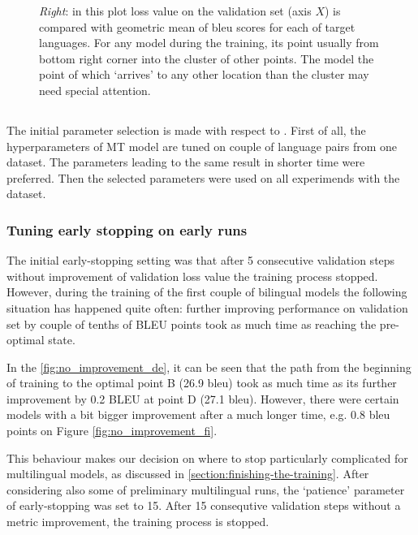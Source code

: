 \begin{figure}[h]
{		\emph{Right}: in this plot loss value on the validation set (axis $X$)
		is compared with geometric mean of \acrshort{bleu} scores
		for each of target languages.
		For any model during the training, its point usually  from
		bottom right corner into the cluster of other points.
		The model the point of which `arrives' to any other location than
		the cluster may need special attention.
	}
	\label{fig:inspect-convergence}
\end{figure}


\cleardoublepage

\subsection{}

The initial parameter selection is made with respect to \cite{training-tips}.
First of all, the hyperparameters of MT model are tuned
on couple of language pairs from one dataset.
The parameters leading to the same result in shorter time were preferred.
Then the selected parameters were used on all experimends with the dataset.


\subsubsection*{Tuning early stopping on early runs}

The initial \gls{early-stopping} setting was that after 5 consecutive
validation steps without improvement of validation \gls{loss} value
the training process stopped.
However, during the training of the first couple of bilingual models
the following situation has happened quite often:
further improving performance on validation set by
couple of tenths of BLEU points took as much time as reaching
the pre-optimal state.

In the \cref{fig:no_improvement_de}, it  can be seen that the path from
the beginning of training to the optimal point B (26.9 \acrshort{bleu})
took as much time as its further improvement by 0.2 BLEU
at point D (27.1 \acrshort{bleu}). However, there were certain models
with a bit bigger improvement after a much longer time, e.g.
0.8 \acrshort{bleu} points on Figure \ref{fig:no_improvement_fi}.

This behaviour makes our decision on where to stop particularly
complicated for multilingual models, as discussed in
\cref{section:finishing-the-training}.
After considering also some of preliminary multilingual runs,
the `patience' parameter of \gls{early-stopping} was set to 15.
After 15 consequtive validation steps without a metric improvement,
the training process is stopped.


